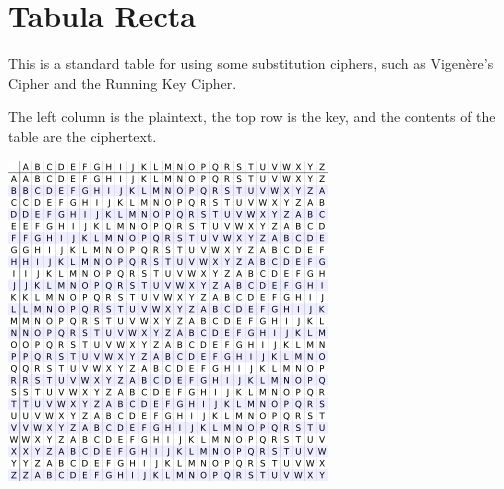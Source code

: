 \documentclass{book}
\newcommand{\<}{\left\langle}
\renewcommand{\>}{\right\rangle}
\theoremstyle{definition}
\begin{document}
\tableofcontents













\backmatter



\clearpage
{}
\printindex

\appendix
\chapter{Tabula Recta}
\label{app:tabularecta}
This is a standard table for using some substitution ciphers, such as Vigen\`ere's Cipher and the Running Key Cipher.

The left column is the plaintext, the top row is the key, and the contents of the table are the ciphertext.

\begin{center}
\includegraphics{img/tabularecta.png}
\end{center}
\end{document}
